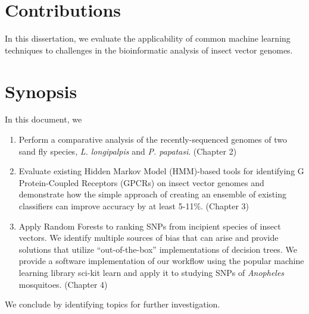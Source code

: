 


\section{Contributions}
In this dissertation, we evaluate the applicability of common machine learning techniques to challenges in the bioinformatic analysis of insect vector genomes.  


\section{Synopsis}
In this document, we

\begin{enumerate}
\item Perform a comparative analysis of the recently-sequenced genomes of two sand fly species, \emph{L. longipalpis} and \emph{P. papatasi}. (Chapter 2)
\item Evaluate existing Hidden Markov Model (HMM)-based tools for identifying G Protein-Coupled Receptors (GPCRs) on insect vector genomes and demonstrate how the simple approach of creating an ensemble of existing classifiers can improve accuracy by at least 5-11\%. (Chapter 3)
\item Apply Random Forests to ranking SNPs from incipient species of insect vectors.  We identify multiple sources of bias that can arise and provide solutions that utilize ``out-of-the-box'' implementations of decision trees.  We provide a software implementation of our workflow using the popular machine learning library sci-kit learn and apply it to studying SNPs of \emph{Anopheles} mosquitoes. (Chapter 4)
\end{enumerate}

We conclude by identifying topics for further investigation.
